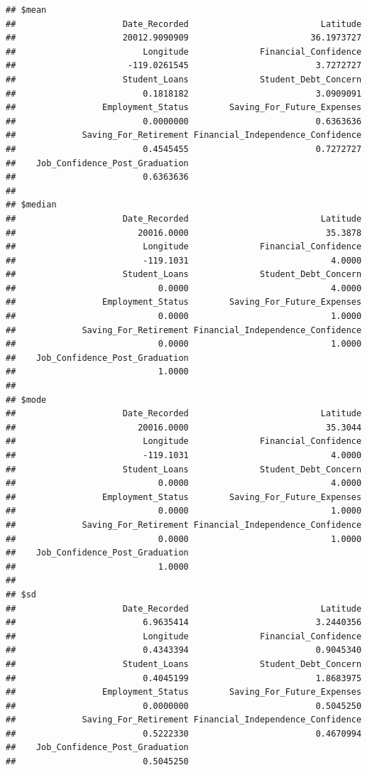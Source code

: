 \documentclass[
]{article}
\begin{document}
\begin{verbatim}
## $mean
##                     Date_Recorded                          Latitude 
##                     20012.9090909                        36.1973727 
##                         Longitude              Financial_Confidence 
##                      -119.0261545                         3.7272727 
##                     Student_Loans              Student_Debt_Concern 
##                         0.1818182                         3.0909091 
##                 Employment_Status        Saving_For_Future_Expenses 
##                         0.0000000                         0.6363636 
##             Saving_For_Retirement Financial_Independence_Confidence 
##                         0.4545455                         0.7272727 
##    Job_Confidence_Post_Graduation 
##                         0.6363636 
## 
## $median
##                     Date_Recorded                          Latitude 
##                        20016.0000                           35.3878 
##                         Longitude              Financial_Confidence 
##                         -119.1031                            4.0000 
##                     Student_Loans              Student_Debt_Concern 
##                            0.0000                            4.0000 
##                 Employment_Status        Saving_For_Future_Expenses 
##                            0.0000                            1.0000 
##             Saving_For_Retirement Financial_Independence_Confidence 
##                            0.0000                            1.0000 
##    Job_Confidence_Post_Graduation 
##                            1.0000 
## 
## $mode
##                     Date_Recorded                          Latitude 
##                        20016.0000                           35.3044 
##                         Longitude              Financial_Confidence 
##                         -119.1031                            4.0000 
##                     Student_Loans              Student_Debt_Concern 
##                            0.0000                            4.0000 
##                 Employment_Status        Saving_For_Future_Expenses 
##                            0.0000                            1.0000 
##             Saving_For_Retirement Financial_Independence_Confidence 
##                            0.0000                            1.0000 
##    Job_Confidence_Post_Graduation 
##                            1.0000 
## 
## $sd
##                     Date_Recorded                          Latitude 
##                         6.9635414                         3.2440356 
##                         Longitude              Financial_Confidence 
##                         0.4343394                         0.9045340 
##                     Student_Loans              Student_Debt_Concern 
##                         0.4045199                         1.8683975 
##                 Employment_Status        Saving_For_Future_Expenses 
##                         0.0000000                         0.5045250 
##             Saving_For_Retirement Financial_Independence_Confidence 
##                         0.5222330                         0.4670994 
##    Job_Confidence_Post_Graduation 
##                         0.5045250
\end{verbatim}
\end{document}
